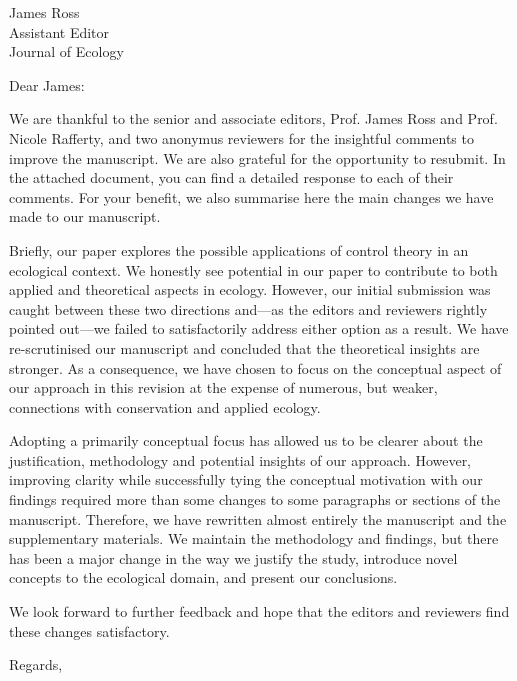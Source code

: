 \documentclass{letter}
\begin{document}
\begin{letter}{James Ross \\ Assistant Editor \\ Journal of Ecology}
\opening{Dear James:}

\onehalfspacing

We are thankful to the senior and associate editors, Prof. James Ross and Prof. Nicole Rafferty, and two anonymus reviewers for the insightful comments to improve the manuscript. 
We are also grateful for the opportunity to resubmit. 
In the attached document, you can find a detailed response to each of their comments. 
For your benefit, we also summarise here the main changes we have made to our manuscript. 

Briefly, our paper explores the possible applications of control theory in an ecological context. 
We honestly see potential in our paper to contribute to both applied and theoretical aspects in ecology. 
However, our initial submission was caught between these two directions and---as the editors and reviewers rightly pointed out---we failed to satisfactorily address either option as a result.
We have re-scrutinised our manuscript and concluded that the theoretical insights are stronger. 
As a consequence, we have chosen to focus on the conceptual aspect of our approach in this revision at the expense of numerous, but weaker, connections with conservation and applied ecology.

Adopting a primarily conceptual focus has allowed us to be clearer about the justification, methodology and potential insights of our approach. 
However, improving clarity while successfully tying the conceptual motivation with our findings required more than some changes to some paragraphs or sections of the manuscript. 
Therefore, we have rewritten almost entirely the manuscript and the supplementary materials. 
We maintain the methodology and findings, but there has been a major change in the way we justify the study, introduce novel concepts to the ecological domain, and present our conclusions. 

We look forward to further feedback and hope that the editors and reviewers find these changes satisfactory.

\closing{Regards,}
\end{letter}
\end{document}
